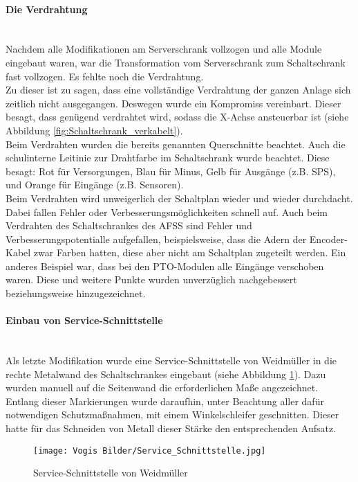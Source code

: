     \paragraph{Die Verdrahtung}\mbox{}\\
    Nachdem alle Modifikationen am Serverschrank vollzogen und alle Module eingebaut waren, war die Transformation vom Serverschrank zum Schaltschrank fast vollzogen. Es fehlte noch die Verdrahtung.\\
    Zu dieser ist zu sagen, dass eine vollständige Verdrahtung der ganzen Anlage sich zeitlich nicht ausgegangen. Deswegen wurde ein Kompromiss vereinbart. Dieser besagt, dass genügend verdrahtet wird, sodass die X-Achse ansteuerbar ist (siehe Abbildung \ref{fig:Schaltschrank_verkabelt}).\\
    Beim Verdrahten wurden die bereits genannten Querschnitte beachtet. Auch die schulinterne Leitinie zur Drahtfarbe im Schaltschrank wurde beachtet. Diese besagt: Rot für Versorgungen, Blau für Minus, Gelb für Ausgänge (z.B. SPS), und Orange für Eingänge (z.B. Sensoren).\\
    Beim Verdrahten wird unweigerlich der Schaltplan wieder und wieder durchdacht. Dabei fallen Fehler oder Verbesserungsmöglichkeiten schnell auf. Auch beim Verdrahten des Schaltschrankes des AFSS sind Fehler und Verbesserungspotentialle aufgefallen, beispielsweise, dass die Adern der Encoder-Kabel zwar Farben hatten, diese aber nicht am Schaltplan zugeteilt werden. Ein anderes Beispiel war, dass bei den PTO-Modulen alle Eingänge verschoben waren. Diese und weitere Punkte wurden unverzüglich nachgebessert beziehungsweise hinzugezeichnet.
    \paragraph{Einbau von Service-Schnittstelle}\mbox{}\\ 
    Als letzte Modifikation wurde eine Service-Schnittstelle von Weidmüller in die rechte Metalwand des Schaltschrankes eingebaut (siehe Abbildung \ref{fig:Service_Schnittstelle}). Dazu wurden manuell auf die Seitenwand die erforderlichen Maße angezeichnet. Entlang dieser Markierungen wurde daraufhin, unter Beachtung aller dafür notwendigen Schutzmaßnahmen, mit einem Winkelschleifer geschnitten. Dieser hatte für das Schneiden von Metall dieser Stärke den entsprechenden Aufsatz. 
    \begin{figure}[H]
        \centering
        \texttt{[image: Vogis Bilder/Service\_Schnittstelle.jpg]}
        \caption{Service-Schnittstelle von Weidmüller}
        \label{fig:Service_Schnittstelle}
    \end{figure}
\newpage

